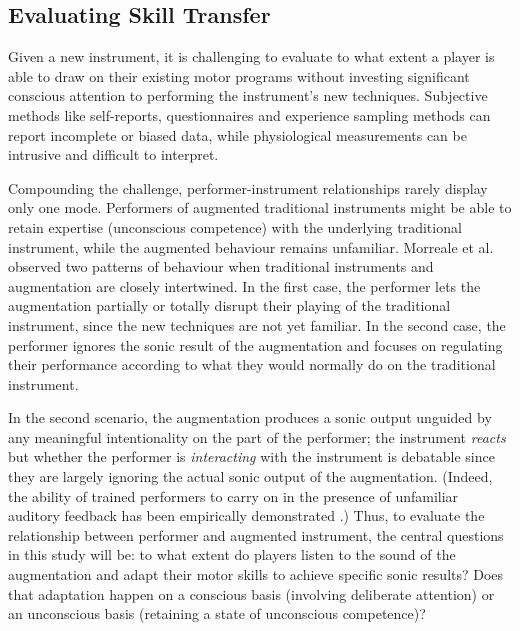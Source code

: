 \documentclass[sigconf]{nimeart}
\begin{document}
\subsection{Evaluating Skill Transfer}\label{evaluating-skill-transfer}

Given a new instrument, it is challenging to evaluate to what extent a player is able to draw on their existing motor programs without investing significant conscious attention to performing the instrument's new techniques. Subjective methods like self-reports, questionnaires and experience sampling methods \cite{csikszentmihalyi2014happiness} can report incomplete or biased data, while physiological measurements \cite{wright2020physiological} can be intrusive and difficult to interpret.

Compounding the challenge, performer-instrument relationships rarely display only one mode. Performers of augmented traditional instruments might be able to retain expertise (unconscious competence) with the underlying traditional instrument, while the augmented behaviour remains unfamiliar. Morreale et al. \cite{morreale2019magpick} observed two patterns of behaviour when traditional instruments and augmentation are closely intertwined. In the first case, the performer lets the augmentation partially or totally disrupt their playing of the traditional instrument, since the new techniques are not yet familiar. In the second case, the performer ignores the sonic result of the augmentation and focuses on regulating their performance according to what they would normally do on the traditional instrument.

In the second scenario, the augmentation produces a sonic output unguided by any meaningful intentionality on the part of the performer; the instrument \emph{reacts} but whether the performer is \emph{interacting} with the instrument is debatable since they are largely ignoring the actual sonic output of the augmentation. (Indeed, the ability of trained performers to carry on in the presence of unfamiliar auditory feedback has been empirically demonstrated \cite{pfordresher2012musical,PfordresherAuditoryFeedback2,HafkeAuditoryFeedback}.) Thus, to evaluate the relationship between performer and augmented instrument, the central questions in this study will be: to what extent do players listen to the sound of the augmentation and adapt their motor skills to achieve specific sonic results? Does that adaptation happen on a conscious basis (involving deliberate attention) or an unconscious basis (retaining a state of unconscious competence)?
\end{document}
